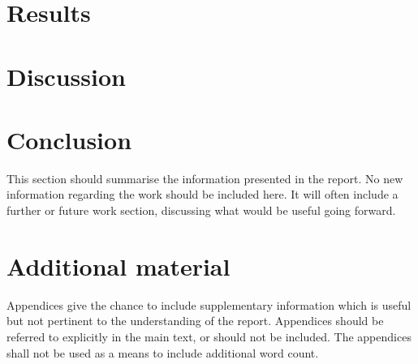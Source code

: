 \documentclass[a4paper,oneside,12pt]{book}
\begin{document}
\chapter{Results}


\chapter{Discussion}



\chapter{Conclusion}
This section should summarise the information presented in the report. No new information regarding the work should be included here. It will often include a further or future work section, discussing what would be useful going forward.


\renewcommand{\bibname}{References}
 

\appendix
\chapter{Additional material}
Appendices give the chance to include supplementary information which is useful but not pertinent to the understanding of the report. Appendices should be referred to explicitly in the main text, or should not be included.	The appendices shall not be used as a means to include additional word count.
\end{document}
